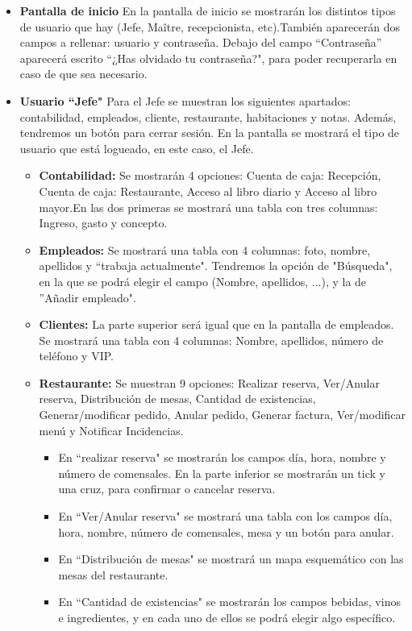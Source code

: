 \documentclass[spanish,a4paper,11pt, twoside]{report}	%
\begin{document}
			\begin{itemize}
				\item \textbf{Pantalla de inicio} En la pantalla de inicio se mostrarán los distintos tipos de usuario que hay (Jefe, Maître, recepcionista, etc).También aparecerán dos campos a rellenar: usuario y contraseña. Debajo del campo “Contraseña'' aparecerá escrito “¿Has olvidado tu contraseña?", para poder recuperarla en caso de que sea necesario.
				\item \textbf{Usuario “Jefe"} Para el Jefe se muestran los siguientes apartados: contabilidad, empleados, cliente, restaurante, habitaciones y notas. Además, tendremos un botón para cerrar sesión. En la pantalla se mostrará el tipo de usuario que está logueado, en este caso, el Jefe. 
				\begin{itemize}
					\item \textbf{Contabilidad: }Se mostrarán 4 opciones: Cuenta de caja: Recepción, Cuenta de caja: Restaurante, Acceso al libro diario y Acceso al libro mayor.En las dos primeras se mostrará una tabla con tres columnas: Ingreso, gasto y concepto.
					 \item \textbf{Empleados: }Se mostrará una tabla con 4 columnas: foto, nombre, apellidos y “trabaja actualmente". Tendremos la opción de "Búsqueda", en la que se podrá elegir el campo (Nombre, apellidos, ...), y la de ''Añadir empleado". 
					 \item \textbf{Clientes: }La parte superior será igual que en la pantalla de empleados. Se mostrará una tabla con 4 columnas: Nombre, apellidos, número de teléfono y VIP. 
					 \item \textbf{Restaurante: }Se muestran 9 opciones: Realizar reserva, Ver/Anular reserva, Distribución de mesas, Cantidad de existencias, Generar/modificar pedido, Anular pedido, Generar factura, Ver/modificar menú y Notificar Incidencias.
					\begin{itemize}
						\item En “realizar reserva" se mostrarán los campos día, hora, nombre y número de comensales. En la parte inferior se mostrarán un tick y una cruz, para confirmar o cancelar reserva. 
						\item En “Ver/Anular reserva" se mostrará una tabla con los campos día, hora, nombre, número de comensales, mesa y un botón para anular. 
						\item En “Distribución de mesas" se mostrará un mapa esquemático con las mesas del restaurante. 
						\item En “Cantidad de existencias" se mostrarán los campos bebidas, vinos e ingredientes, y en cada uno de ellos se podrá elegir algo específico. 

\end{itemize}
\end{itemize}
\end{itemize}
\end{document}
